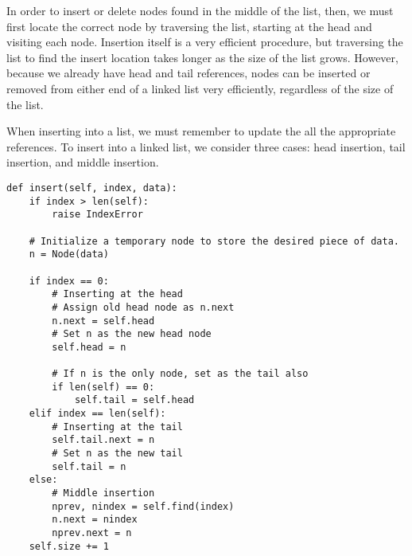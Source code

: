 In order to insert or delete nodes found in the middle of the list, then, we must first locate the correct node by traversing the list, starting at the head and visiting each node.
Insertion itself is a very efficient procedure, but traversing the list to find the insert location takes longer as the size of the list grows. 
However, because we already have head and tail references, nodes can be inserted or removed from either end of a linked list very efficiently, regardless of the size of the list.

When inserting into a list, we must remember to update the all the appropriate references.
To insert into a linked list, we consider three cases: head insertion, tail insertion, and middle insertion. 
\begin{lstlisting}
def insert(self, index, data):
    if index > len(self):
        raise IndexError
        
    # Initialize a temporary node to store the desired piece of data.
    n = Node(data)
    
    if index == 0:
        # Inserting at the head
        # Assign old head node as n.next
        n.next = self.head
        # Set n as the new head node
        self.head = n
        
        # If n is the only node, set as the tail also
        if len(self) == 0:
            self.tail = self.head
    elif index == len(self):
        # Inserting at the tail
        self.tail.next = n
        # Set n as the new tail
        self.tail = n
    else: 
        # Middle insertion
        nprev, nindex = self.find(index)
        n.next = nindex
        nprev.next = n
    self.size += 1
\end{lstlisting}

